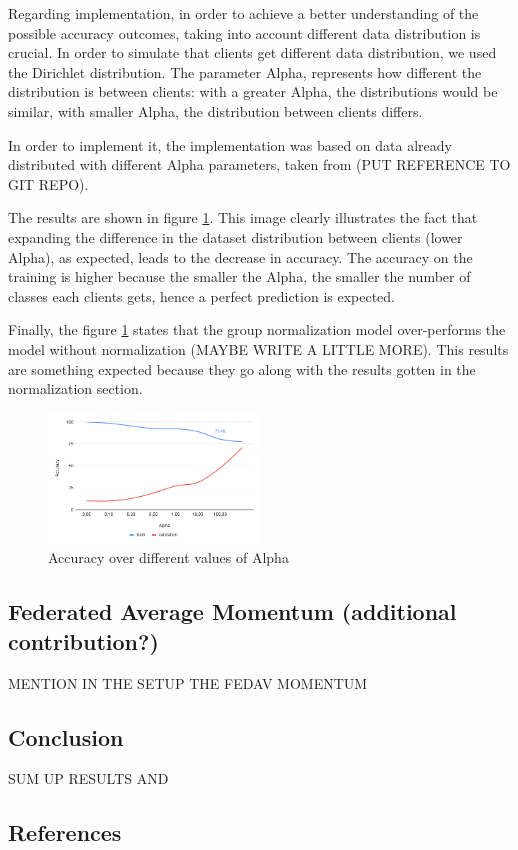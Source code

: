 \documentclass[twocolumn]{article}
\begin{document}
Regarding implementation, in order to achieve a better understanding of the possible accuracy outcomes, taking into account different data distribution is crucial. In order to simulate that clients get different data distribution, we used the Dirichlet distribution. The parameter Alpha, represents how different the distribution is between clients: with a greater Alpha, the distributions 
would be similar, with smaller Alpha, the distribution between clients differs.

In order to implement it, the implementation was based on data already distributed with different Alpha parameters, taken from (PUT REFERENCE TO GIT REPO).

The results are shown in figure \ref{AccAlpha}. This image clearly illustrates the fact that expanding the difference in the dataset distribution between clients (lower Alpha), as expected, leads to the decrease in accuracy. The accuracy on the training is higher because the smaller the Alpha, the smaller the number of classes each clients gets, hence a perfect prediction is expected. 

Finally, the figure \ref{AccAlpha} states that the group normalization model over-performs the model without normalization (MAYBE WRITE A LITTLE MORE). This results are something expected because they go along with the results gotten in the normalization section. 



\begin{figure}
    \centering
    \includegraphics[width=0.5\textwidth,height=.3\textheight]{alphaAccuracy.png}
    \caption{Accuracy over different values of Alpha}
    \label{AccAlpha} 
\end{figure}


\subsection{Federated Average Momentum (additional contribution?)}
MENTION IN THE SETUP THE FEDAV MOMENTUM

\subsection{Conclusion}
SUM UP RESULTS AND 
\subsection{References}
\end{document}
